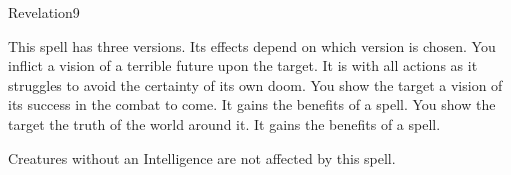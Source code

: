 \begin{spellsection}{Revelation}{9}
    \begin{spellheader}
    \end{spellheader}
    \begin{spellcontent}
        \begin{spelltargetinginfo}
        \end{spelltargetinginfo}
        \begin{spelleffects}
            \spellspecial This spell has three versions. Its effects depend on which version is chosen.
             You inflict a vision of a terrible future upon the target. It is \severelyimpaired with all actions as it struggles to avoid the certainty of its own doom.
             You show the target a vision of its success in the combat to come. It gains the benefits of a  spell.
             You show the target the truth of the world around it. It gains the benefits of a  spell.
            \spelldur \durshort
        \end{spelleffects}
    \end{spellcontent}
    \begin{spellfooter}
        \spellnotes Creatures without an Intelligence are not affected by this spell.
        \miscastrandom
    \end{spellfooter}
\end{spellsection}

